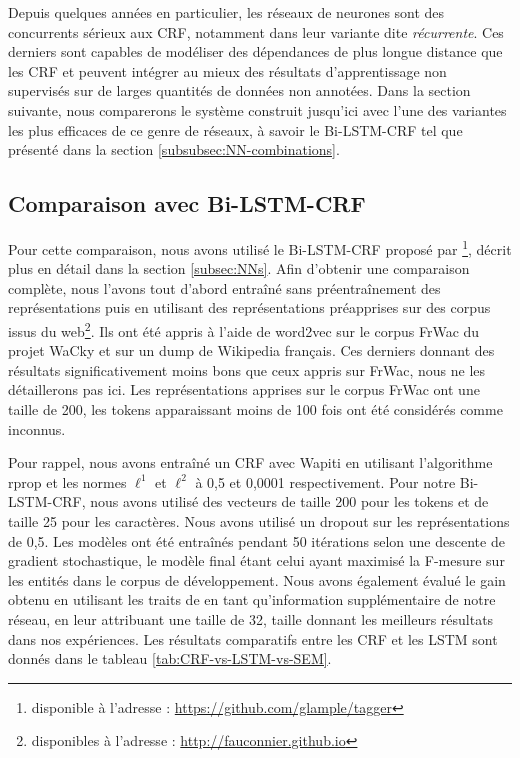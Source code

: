 \documentclass[12pt,a4paper,times,twoside,openright]{report}
\begin{document}
Depuis quelques années en particulier, les réseaux de neurones sont des concurrents sérieux aux CRF, notamment dans leur variante dite \emph{récurrente}. Ces derniers sont capables de modéliser des dépendances de plus longue distance que les CRF et peuvent intégrer au mieux des résultats d'apprentissage non supervisés sur de larges quantités de données non annotées. Dans la section suivante, nous comparerons le système construit jusqu'ici avec l'une des variantes les plus efficaces de ce genre de réseaux, à savoir le Bi-LSTM-CRF tel que présenté dans la section \ref{subsubsec:NN-combinations}.



        \subsection{Comparaison avec Bi-LSTM-CRF}
        \label{subsec:taxonomy-ftb-lstm}
Pour cette comparaison, nous avons utilisé le Bi-LSTM-CRF proposé par \citet{lample2016neural}\footnote{disponible à l'adresse : \url{https://github.com/glample/tagger}}, décrit plus en détail dans la section \ref{subsec:NNs}. Afin d'obtenir une comparaison complète, nous l'avons tout d'abord entraîné sans préentraînement des représentations puis en utilisant des représentations préapprises sur des corpus issus du web\footnote{disponibles à l'adresse : \url{http://fauconnier.github.io}}. Ils ont été appris à l'aide de word2vec \citep{mikolov2014word2vec} sur le corpus FrWac du projet WaCky \citep{baroni2009wacky} et sur un dump de Wikipedia français. Ces derniers donnant des résultats significativement moins bons que ceux appris sur FrWac, nous ne les détaillerons pas ici. Les représentations apprises sur le corpus FrWac ont une taille de 200, les tokens apparaissant moins de 100 fois ont été considérés comme inconnus.

Pour rappel, nous avons entraîné un CRF avec Wapiti en utilisant l'algorithme rprop et les normes $\ell^{1}$ et $\ell^{2}$ à 0,5 et 0,0001 respectivement. Pour notre Bi-LSTM-CRF, nous avons utilisé des vecteurs de taille 200 pour les tokens et de taille 25 pour les caractères. Nous avons utilisé un dropout sur les représentations de 0,5. Les modèles ont été entraînés pendant 50 itérations selon une descente de gradient stochastique, le modèle final étant celui ayant maximisé la F-mesure sur les entités dans le corpus de développement. Nous avons également évalué le gain obtenu en utilisant les traits de \citet{raymond2010reconnaissance} en tant qu'information supplémentaire de notre réseau, en leur attribuant une taille de 32, taille donnant les meilleurs résultats dans nos expériences. Les résultats comparatifs entre les CRF et les LSTM sont donnés dans le tableau \ref{tab:CRF-vs-LSTM-vs-SEM}.
\end{document}
